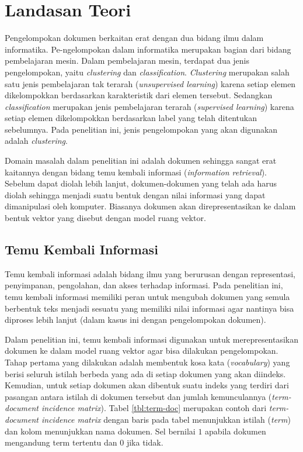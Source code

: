 \chapter{Landasan Teori}
\label{chap:teori}

Pengelompokan dokumen berkaitan erat dengan dua bidang ilmu dalam informatika. Pe-ngelompokan dalam informatika merupakan bagian dari bidang pembelajaran mesin. Dalam pembelajaran mesin, terdapat dua jenis pengelompokan, yaitu \textit{clustering} dan \textit{classification}. \textit{Clustering} merupakan salah satu jenis pembelajaran tak terarah (\textit{unsupervised learning}) karena setiap elemen dikelompokkan berdasarkan karakteristik dari elemen tersebut. Sedangkan \textit{classification} merupakan jenis pembelajaran terarah (\textit{supervised learning}) karena setiap elemen dikelompokkan berdasarkan label yang telah ditentukan sebelumnya. Pada penelitian ini, jenis pengelompokan yang akan digunakan adalah \textit{clustering}.

Domain masalah dalam penelitian ini adalah dokumen sehingga sangat erat kaitannya dengan bidang temu kembali informasi (\textit{information retrieval}). Sebelum dapat diolah lebih lanjut, dokumen-dokumen yang telah ada harus diolah sehingga menjadi suatu bentuk dengan nilai informasi yang dapat dimanipulasi oleh komputer. Biasanya dokumen akan direpresentasikan ke dalam bentuk vektor yang disebut dengan model ruang vektor.

\section{Temu Kembali Informasi}
\label{sec:tki}
Temu kembali informasi adalah bidang ilmu yang berurusan dengan representasi, penyimpanan, pengolahan, dan akses terhadap informasi.\cite{baeza1999modern} Pada penelitian ini, temu kembali informasi memiliki peran untuk mengubah dokumen yang semula berbentuk teks menjadi sesuatu yang memiliki nilai informasi agar nantinya bisa diproses lebih lanjut (dalam kasus ini dengan pengelompokan dokumen).

Dalam penelitian ini, temu kembali informasi digunakan untuk merepresentasikan dokumen ke dalam model ruang vektor agar bisa dilakukan pengelompokan. Tahap pertama yang dilakukan adalah membentuk kosa kata (\textit{vocabulary}) yang berisi seluruh istilah berbeda yang ada di setiap dokumen yang akan diindeks. Kemudian, untuk setiap dokumen akan dibentuk suatu indeks yang terdiri dari pasangan antara istilah di dokumen tersebut dan jumlah kemunculannya (\textit{term-document incidence matrix}). Tabel \ref{tbl:term-doc} merupakan contoh dari \textit{term-document incidence matrix} dengan baris pada tabel menunjukkan istilah (\textit{term}) dan kolom menunjukkan nama dokumen. Sel bernilai $1$ apabila dokumen mengandung term tertentu dan $0$ jika tidak.

